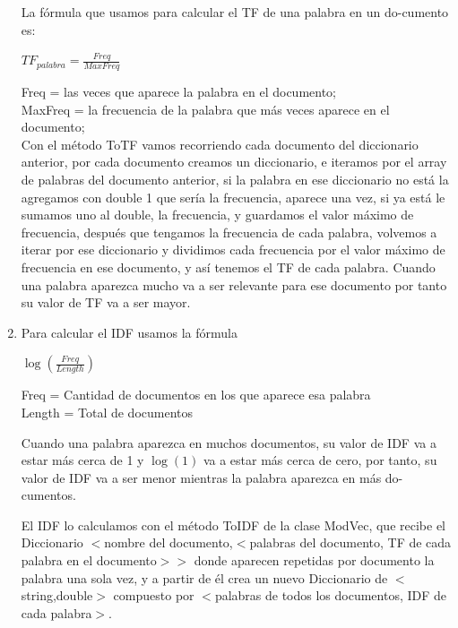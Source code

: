 \documentclass[12pt, a4paper]{article}
\begin{document}
\begin{enumerate}
            La fórmula que usamos para calcular el TF de una palabra
            en un do-cumento es:

            \begin{center}
                  {\large$TF_{palabra}=\frac{Freq}{MaxFreq}$}
            \end{center}

            Freq = las veces que aparece la palabra en el documento;\\
            MaxFreq = la frecuencia de la palabra que más veces aparece en el documento;\\
            
            Con el método ToTF vamos recorriendo cada documento del diccionario anterior,
            por cada documento creamos un diccionario, e iteramos por el array de
            palabras del documento anterior, si la palabra en ese diccionario no
            está la agregamos con double 1 que sería la frecuencia, aparece una vez,
            si ya está le sumamos uno al double, la frecuencia,
            y guardamos el valor máximo de frecuencia, después que tengamos
            la frecuencia de cada palabra, volvemos a iterar por ese diccionario y
            dividimos cada frecuencia por el valor máximo de frecuencia en ese documento,
            y así tenemos el TF de cada palabra. Cuando una palabra aparezca mucho va a ser
            relevante para ese documento por tanto su valor de TF va a ser mayor.

      \item Para calcular el IDF usamos la fórmula 
            \begin{center}
                  {\large$\log(\frac{Freq}{Length})$}                  
            \end{center}
            
            Freq = Cantidad de documentos en los que aparece esa palabra\\
            Length = Total de documentos

            Cuando una palabra aparezca en muchos documentos, su valor de IDF va a estar más
            cerca de 1 y $\log(1)$ va a estar más cerca de cero, por tanto, su valor de IDF va a
            ser menor mientras la palabra aparezca en más do-cumentos.
            
            El IDF lo calculamos con el método ToIDF de la clase ModVec, que recibe
            el Diccionario
            $<$nombre del documento,$<$palabras del documento, TF de cada palabra en el documento$>>$
            donde aparecen repetidas por documento la palabra una sola vez, y a partir de él
            crea un nuevo Diccionario de $<$string,double$>$ compuesto por
            $<$palabras de todos los documentos, IDF de cada palabra$>$.
            

\end{enumerate}
\end{document}
